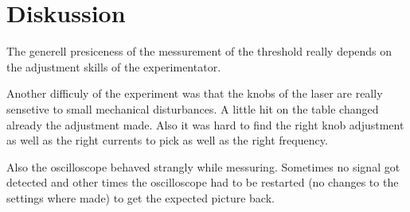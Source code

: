 \section{Diskussion}
\label{sec:Diskussion}

The generell presiceness of the messurement of the threshold really depends on the adjustment skills of the 
experimentator. 

\noindent
Another difficuly of the experiment was that the knobs of the laser are really sensetive to small
mechanical disturbances. A little hit on the table changed already the adjustment made. 
Also it was hard to find the right knob adjustment as well as the right currents to pick as well as the right
frequency.

\noindent
Also the oscilloscope behaved strangly while messuring. Sometimes no signal got detected and other times 
the oscilloscope had to be restarted (no changes to the settings where made) to get the expected picture back.


